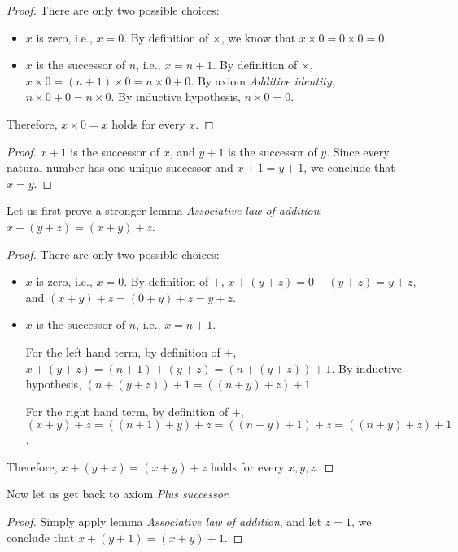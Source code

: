 \documentclass[11pt,a4paper]{article}
\begin{document}

\begin{proof} 
  There are only two possible choices:
  \begin{itemize}
    \item $x$ is zero, i.e., $x = 0$. By definition of $\times$, we know that $x \times 0 = 0 \times 0 = 0$.
    \item $x$ is the successor of $n$, i.e., $x = n + 1$. By definition of $\times$, $x \times 0 = (n + 1) \times 0 = n \times 0 + 0$. By axiom \emph{Additive identity}, $n \times 0 + 0 = n \times 0$. By inductive hypothesis, $n \times 0 = 0$.
  \end{itemize}
  Therefore, $x \times 0 = x$ holds for every $x$.
\end{proof}


\begin{proof}
  $x + 1$ is the successor of $x$, and $y + 1$ is the successor of $y$. Since every natural number has one unique successor and $x + 1 = y + 1$, we conclude that $x = y$.
\end{proof}


Let us first prove a stronger lemma \emph{Associative law of addition}: $x + (y + z) = (x + y) + z$.

\begin{proof}
  There are only two possible choices:
  \begin{itemize}
    \item $x$ is zero, i.e., $x = 0$. By definition of $+$, $x + (y + z) = 0 + (y + z) = y + z$, and $(x + y) + z = (0 + y) + z = y + z$.
    \item $x$ is the successor of $n$, i.e., $x = n + 1$. 
    
    For the left hand term, by definition of $+$, $x + (y + z) = (n + 1) + (y + z) = (n + (y + z)) + 1$. By inductive hypothesis, $(n + (y + z)) + 1 = ((n + y) + z) + 1$.
    
    For the right hand term, by definition of $+$, $(x + y) + z = ((n + 1) + y) + z = ((n + y) + 1) + z = ((n + y) + z) + 1$.
  \end{itemize}
   Therefore, $x + (y + z) = (x + y) + z$ holds for every $x,y , z$.
\end{proof}

Now let us get back to axiom \emph{Plus successor}.

\begin{proof}
  Simply apply lemma \emph{Associative law of addition}, and let $z = 1$, we conclude that $x + (y + 1) = (x + y) + 1$.
\end{proof}
\end{document}
